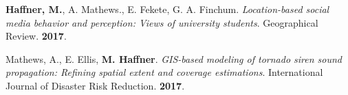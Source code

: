 




\begin{cventries}
   \cventry
      {}
      {}
      {}
      {}
      {
        \begin{cvitems}
          \vspace{-4mm}
        \item {\textbf{Haffner, M.}, A. Mathews., E. Fekete, G. A. Finchum.
            \textit{Location-based social media behavior and perception: Views
              of university students}. Geographical Review. \textbf{2017}.} \\
          \vspace{-2mm}
        \end{cvitems}
    }
   \cventry
      {}
      {}
      {}
      {}
      {
        \begin{cvitems}
          \vspace{-4mm}
        \item
          {Mathews, A., E. Ellis, \textbf{M. Haffner}.
            \textit{GIS-based modeling of tornado siren sound propagation:
              Refining spatial extent and coverage estimations}. International
            Journal of Disaster Risk Reduction. \textbf{2017}.} \\
          \vspace{-2mm}
        \end{cvitems}
    }
\end{cventries}



